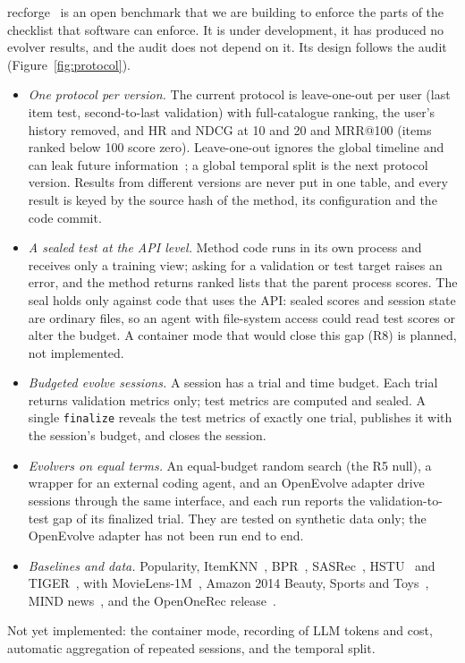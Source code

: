 \documentclass[sigconf,nonacm]{acmart}
\begin{document}
recforge~\cite{recforge} is an open benchmark that we are building to enforce the parts of the checklist that
software can enforce. It is under development, it has produced no evolver results, and the audit does not depend on
it. Its design follows the audit (Figure~\ref{fig:protocol}).



\begin{itemize}
\item \emph{One protocol per version.} The current protocol is leave-one-out per user (last item test,
second-to-last validation) with full-catalogue ranking, the user's history removed, and HR and NDCG at 10 and 20
and MRR@100 (items ranked below 100 score zero). Leave-one-out ignores the global timeline and can leak future
information~\cite{ji2020leakage,hidasi2023flaws}; a global temporal split is the next protocol version. Results from
different versions are never put in one table, and every result is keyed by the source hash of the method, its
configuration and the code commit.
\item \emph{A sealed test at the API level.} Method code runs in its own process and receives only a training view;
asking for a validation or test target raises an error, and the method returns ranked lists that the parent process
scores. The seal holds only against code that uses the API: sealed scores and session state are ordinary files, so
an agent with file-system access could read test scores or alter the budget. A container mode that would close this
gap (R8) is planned, not implemented.
\item \emph{Budgeted evolve sessions.} A session has a trial and time budget. Each trial returns validation metrics
only; test metrics are computed and sealed. A single \texttt{finalize} reveals the test metrics of exactly one
trial, publishes it with the session's budget, and closes the session.
\item \emph{Evolvers on equal terms.} An equal-budget random search (the R5 null), a wrapper for an external coding
agent, and an OpenEvolve adapter drive sessions through the same interface, and each run reports the
validation-to-test gap of its finalized trial. They are tested on synthetic data only; the OpenEvolve adapter has
not been run end to end.
\item \emph{Baselines and data.} Popularity, ItemKNN~\cite{sarwar2001itemknn}, BPR~\cite{rendle2009bpr},
SASRec~\cite{kang2018sasrec}, HSTU~\cite{zhai2024hstu} and TIGER~\cite{rajput2023tiger}, with
MovieLens-1M~\cite{harper2015movielens}, Amazon 2014 Beauty, Sports and Toys~\cite{mcauley2015amazon}, MIND
news~\cite{wu2020mind}, and the OpenOneRec release~\cite{zhou2025openonerec}.
\end{itemize}
Not yet implemented: the container mode, recording of LLM tokens and cost, automatic aggregation of repeated
sessions, and the temporal split.

\end{document}
